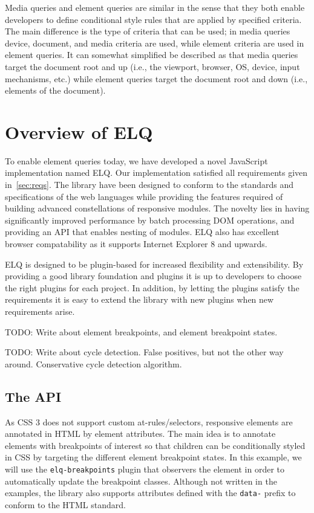 \documentclass{acm_proc_article-sp}
\newcommand{\code}[1]{\texttt{#1}}
\newcommand{\elq}{ELQ}
\begin{document}
  Media queries and element queries are similar in the sense that they both enable developers to define conditional style rules that are applied by specified criteria.
  The main difference is the type of criteria that can be used; in media queries device, document, and media criteria are used, while element criteria are used in element queries.
  It can somewhat simplified be described as that media queries target the document root and up (i.e., the viewport, browser, OS, device, input mechanisms, etc.) while element queries target the document root and down (i.e., elements of the document).

\section{Overview of \elq{}}
  To enable element queries today, we have developed a novel JavaScript implementation named \elq{}.
  Our implementation satisfied all requirements given in~\ref{sec:reqs}.
  The library have been designed to conform to the standards and specifications of the web languages while providing the features required of building advanced constellations of responsive modules.
  The novelty lies in having significantly improved performance by batch processing DOM operations, and providing an API that enables nesting of modules.
  \elq{} also has excellent browser compatability as it supports Internet Explorer 8 and upwards.

  \elq{} is designed to be plugin-based for increased flexibility and extensibility.
  By providing a good library foundation and plugins it is up to developers to choose the right plugins for each project.
  In addition, by letting the plugins satisfy the requirements it is easy to extend the library with new plugins when new requirements arise.

  TODO: Write about element breakpoints, and element breakpoint states.

  TODO: Write about cycle detection. False positives, but not the other way around. Conservative cycle detection algorithm.

  \subsection{The API}
    As CSS 3 does not support custom at-rules/selectors, responsive elements are annotated in HTML by element attributes.
    The main idea is to annotate elements with breakpoints of interest so that children can be conditionally styled in CSS by targeting the different element breakpoint states.
    In this example, we will use the \code{elq-breakpoints} plugin that observers the element in order to automatically update the breakpoint classes.
    Although not written in the examples, the library also supports attributes defined with the \code{data-} prefix to conform to the HTML standard.
\end{document}

